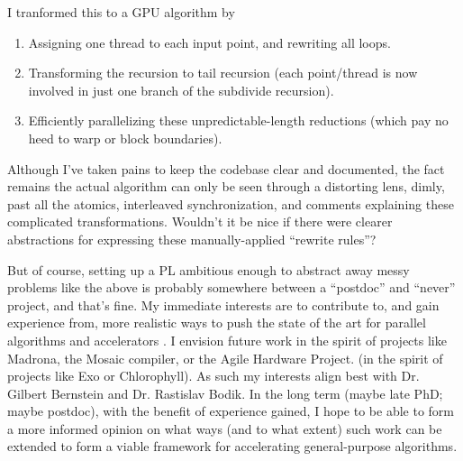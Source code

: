 I tranformed this to a GPU algorithm by
\begin{enumerate}
  \item Assigning one thread to each input point, and rewriting all
  loops.

  \item Transforming the recursion to tail recursion (each
  point/thread is now involved in just one branch of the subdivide
  recursion).

  \item Efficiently parallelizing these unpredictable-length
  reductions (which pay no heed to warp or block boundaries).
\end{enumerate}

Although I've taken pains to keep the codebase clear and documented,
the fact remains the actual algorithm can only be seen through a
distorting lens, dimly, past all the atomics, interleaved
synchronization, and comments explaining these complicated
transformations. Wouldn't it be nice if there were clearer
abstractions for expressing these manually-applied ``rewrite rules''?


But of course, setting up a PL ambitious enough to abstract away messy
problems like the above is probably somewhere between a ``postdoc''
and ``never'' project, and that's fine. My immediate interests are to
contribute to, and gain experience from, more realistic ways to push
the state of the art for parallel algorithms and accelerators%
\ifdefined\STANFORD
. I envision future work in the spirit of projects like Madrona, the
Mosaic compiler, or the Agile Hardware Project.
\fi
\ifdefined\UW
(in the spirit of projects like Exo or Chlorophyll). As such my
interests align best with Dr. Gilbert Bernstein and Dr. Rastislav
Bodik.
\fi
In the long term (maybe late PhD; maybe postdoc), with the benefit of
experience gained, I hope to be able to form a more informed opinion
on what ways (and to what extent) such work can be extended to form a
viable framework for accelerating general-purpose algorithms.



